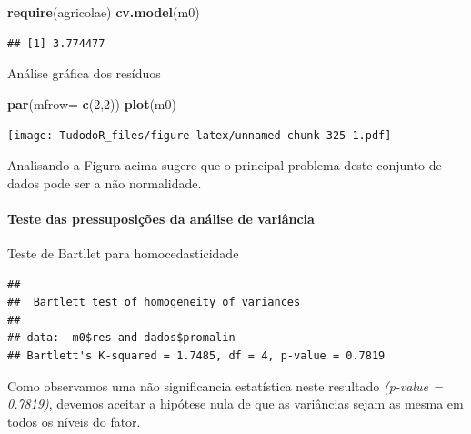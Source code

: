 \documentclass[
]{book}
\newenvironment{Shaded}{\begin{snugshade}}{\end{snugshade}}
\newcommand{\DataTypeTok}[1]{\textcolor[rgb]{0.13,0.29,0.53}{#1}}
\newcommand{\DecValTok}[1]{\textcolor[rgb]{0.00,0.00,0.81}{#1}}
\newcommand{\KeywordTok}[1]{\textcolor[rgb]{0.13,0.29,0.53}{\textbf{#1}}}
\newcommand{\NormalTok}[1]{#1}
\newcommand{\OperatorTok}[1]{\textcolor[rgb]{0.81,0.36,0.00}{\textbf{#1}}}
\begin{document}
\begin{Shaded}
\begin{Highlighting}[]
\KeywordTok{require}\NormalTok{(agricolae)}
\KeywordTok{cv.model}\NormalTok{(m0)}
\end{Highlighting}
\end{Shaded}

\begin{verbatim}
## [1] 3.774477
\end{verbatim}

Análise gráfica dos resíduos

\begin{Shaded}
\begin{Highlighting}[]
\KeywordTok{par}\NormalTok{(}\DataTypeTok{mfrow=} \KeywordTok{c}\NormalTok{(}\DecValTok{2}\NormalTok{,}\DecValTok{2}\NormalTok{))}
\KeywordTok{plot}\NormalTok{(m0)}
\end{Highlighting}
\end{Shaded}

\texttt{[image: TudodoR\_files/figure-latex/unnamed-chunk-325-1.pdf]}

Analisando a Figura acima sugere que o principal problema deste conjunto de dados pode ser a não normalidade.

\hypertarget{teste-das-pressuposiuxe7uxf5es-da-anuxe1lise-de-variuxe2ncia}{%
\paragraph{Teste das pressuposições da análise de variância}\label{teste-das-pressuposiuxe7uxf5es-da-anuxe1lise-de-variuxe2ncia}}

Teste de Bartllet para homocedasticidade

\begin{Shaded}
\end{Shaded}

\begin{verbatim}
## 
##  Bartlett test of homogeneity of variances
## 
## data:  m0$res and dados$promalin
## Bartlett's K-squared = 1.7485, df = 4, p-value = 0.7819
\end{verbatim}

Como observamos uma não significancia estatística neste resultado \emph{(p-value = 0.7819)}, devemos aceitar a hipótese nula de que as variâncias sejam as mesma em todos os níveis do fator.
\end{document}
